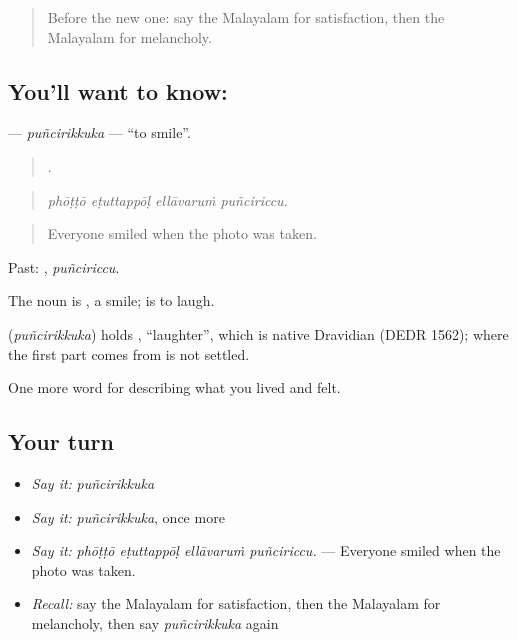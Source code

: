 \label{lesson:ML-C521-puncirikkuka}



\begin{quote}
Before the new one: say the Malayalam for satisfaction, then the Malayalam for melancholy.
\end{quote}

\subsection*{You'll want to know: }
\textbf{} — \emph{puñcirikkuka} — \textquotedblleft{}to smile\textquotedblright{}.

\begin{quote}
   .
\end{quote}

\begin{quote}
\emph{phōṭṭō eṭuttappōḷ ellāvaruṁ puñciriccu.}
\end{quote}

\begin{quote}
Everyone smiled when the photo was taken.
\end{quote}

Past: , \emph{puñciriccu}.

The noun is , a smile;  is to laugh.

\begin{cousinweb}
\textbf{} (\emph{puñcirikkuka}) holds , \textquotedblleft{}laughter\textquotedblright{}, which is native Dravidian (DEDR 1562); where the first part comes from is not settled.
\end{cousinweb}

\begin{grammarlens}[title={What you've built}]
One more word for describing what you lived and felt.
\end{grammarlens}

\subsection*{Your turn}
\begin{itemize}
\raggedright
  \item \emph{Say it:} \emph{puñcirikkuka}
  \item \emph{Say it:} \emph{puñcirikkuka}, once more
  \item \emph{Say it:} \emph{phōṭṭō eṭuttappōḷ ellāvaruṁ puñciriccu.} — Everyone smiled when the photo was taken.
  \item \emph{Recall:} say the Malayalam for satisfaction, then the Malayalam for melancholy, then say \emph{puñcirikkuka} again
\end{itemize}

